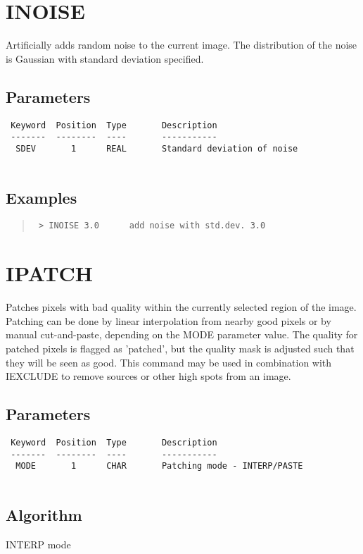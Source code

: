 \documentclass{book}
\renewcommand{\_}{{\tt\char'137}}     %
\begin{document}
\section{INOISE}
Artificially adds random noise to the current image. The distribution
of the noise is Gaussian with standard deviation specified.
 
\subsection{Parameters}
\begin{verbatim}
 Keyword  Position  Type       Description
 -------  --------  ----       -----------
  SDEV       1      REAL       Standard deviation of noise
 
\end{verbatim}\subsection{Examples}
\begin{quote}\begin{verbatim}
 > INOISE 3.0      add noise with std.dev. 3.0
 \end{verbatim}\end{quote}
\section{IPATCH}
Patches pixels with bad quality within the currently selected region
of the image. Patching can be done by linear interpolation from nearby
good pixels or by manual cut-and-paste, depending on the MODE parameter
value. The quality for patched pixels is flagged as 'patched',
but the quality mask is adjusted such that they will be seen as good.
This command may be used in combination with IEXCLUDE to remove sources
or other high spots from an image.
 
\subsection{Parameters}
\begin{verbatim}
 Keyword  Position  Type       Description
 -------  --------  ----       -----------
  MODE       1      CHAR       Patching mode - INTERP/PASTE
 
\end{verbatim}\subsection{Algorithm}
INTERP mode
 
\end{document}
